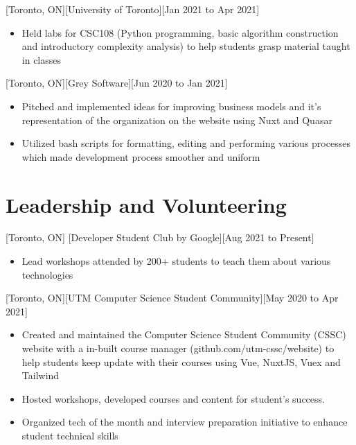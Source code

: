 \documentclass{article}
\begin{document}
[Toronto, ON][University of Toronto][Jan 2021 to Apr 2021]

 \begin{itemize}
    \item Held labs for CSC108 (Python programming, basic algorithm construction and introductory complexity analysis) to help students grasp material taught in classes
 \end{itemize}
 
[Toronto, ON][Grey Software][Jun 2020 to Jan 2021]

 \begin{itemize}
    \item Pitched and implemented ideas for improving business models and it's representation of the organization on the website using Nuxt and Quasar
    \item Utilized bash scripts for formatting, editing and performing various processes which made development process smoother and uniform
 \end{itemize}
 
 
 
\section{Leadership and Volunteering}
[Toronto, ON]
[Developer Student Club by Google][Aug 2021 to Present]
 \begin{itemize}
     \item Lead workshops attended by 200+ students to teach them about various technologies
 \end{itemize}

[Toronto, ON][UTM Computer Science Student Community][May 2020 to Apr 2021]
 \begin{itemize}
    \item Created and maintained the Computer Science Student Community (CSSC) website with a in-built course manager (github.com/utm-cssc/website) to help students keep update with their courses using Vue, NuxtJS, Vuex and Tailwind
    \item Hosted workshops, developed courses and content for student’s success.
    \item Organized tech of the month and interview preparation initiative to enhance student technical skills
 \end{itemize}
 
\end{document}
